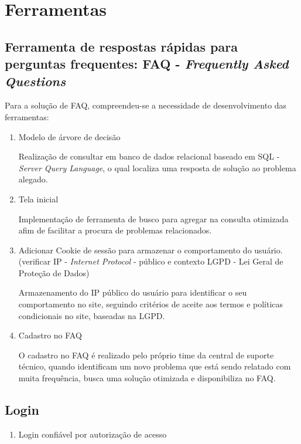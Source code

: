 \documentclass[
    12pt,               %
    openright,          %
    oneside,
    a4paper,            %
    MODELO,             %
    english,            %
    brazil              %
   ]{ifsp-spo-inf-ctds}
\begin{document}
\chapter{Ferramentas}

\section{Ferramenta de respostas rápidas para perguntas frequentes: FAQ - \textit{Frequently Asked Questions}}

	Para a solução de FAQ, compreendeu-se a necessidade de desenvolvimento das ferramentas:
	
	\begin{enumerate}
		
		\item 
		Modelo de árvore de decisão
		
		Realização de consultar em banco de dados relacional baseado em SQL - \textit{Server Query Language}, o qual localiza uma resposta de solução ao problema alegado.
		
		\item 
		Tela inicial
		
		Implementação de ferramenta de busco para agregar na consulta otimizada afim de facilitar a procura de problemas relacionados.
		
		\item 
		Adicionar Cookie de sessão para armazenar o comportamento do usuário. (verificar IP - \textit{Internet Protocol} - público e contexto LGPD - Lei Geral de Proteção de Dados)
		
		Armazenamento do IP público do usuário para identificar o seu comportamento no site, seguindo critérios de aceite aos termos e políticas condicionais no site, baseadas na LGPD.
		
		\item 
		Cadastro no FAQ
		
		O cadastro no FAQ é realizado pelo próprio time da central de suporte técnico, quando identificam um novo problema que está sendo relatado com muita frequência, busca uma solução otimizada e disponibiliza no FAQ. 
		
	\end{enumerate}

\section{Login}

	\begin{enumerate}
		
		\item 
		Login confiável por autorização de acesso
		
	\end{enumerate}
\end{document}

